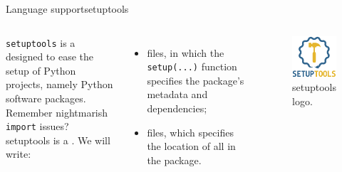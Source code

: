 \begin{frame}{Language support}{setuptools}
  \begin{columns}
    \texttt{setuptools} is a  designed to ease the setup of Python projects, namely Python software packages.\\
    Remember nightmarish \texttt{import} issues? setuptools is a .
    \newline\newline
    We will write:
    \begin{itemize}
      \item {} files, in which the \texttt{setup(...)} function specifies the package's metadata and dependencies;
      \item {} files, which specifies the location of all  in the package.
    \end{itemize}

    \begin{figure}
      \centering
      \includegraphics[width=.7\textwidth]{setuptools}
      \caption{setuptools logo.}
      \label{fig:setuptools}
    \end{figure}
  \end{columns}
\end{frame}
